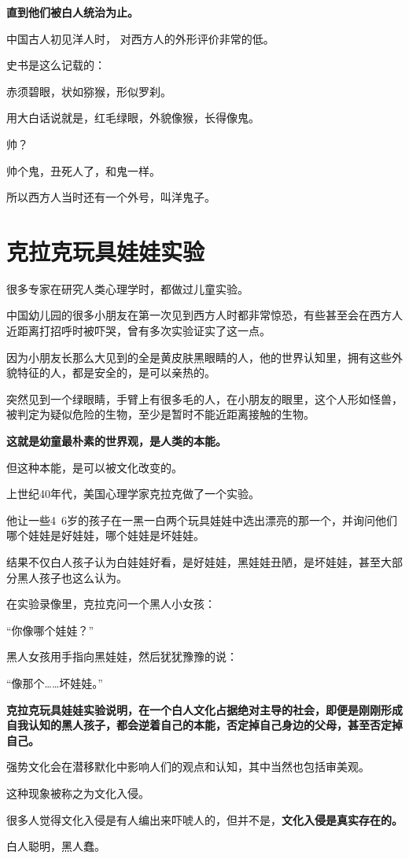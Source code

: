 \documentclass[UTF8, 11pt, oneside]{ctexart}
\newcommand{\zd}[1]{\textbf{\textcolor[RGB]{123,12,0}{#1}}} %
\newcommand{\yh}[1]{%
    \begin{tcolorbox}[enhanced,
        frame hidden, interior hidden,
        before skip = 5mm, left skip=10mm,
        borderline west={5pt}{0pt}{gray!50}]
        #1
    \end{tcolorbox}
}
\newcommand{\biaoti}[1]{%
    \section*{#1}
}
\begin{document}
\zd{直到他们被白人统治为止。}

中国古人初见洋人时， 对西方人的外形评价非常的低。

史书是这么记载的：

\yh{赤须碧眼，状如猕猴，形似罗刹。}

用大白话说就是，红毛绿眼，外貌像猴，长得像鬼。

帅？

帅个鬼，丑死人了，和鬼一样。

所以西方人当时还有一个外号，叫洋鬼子。


\biaoti{克拉克玩具娃娃实验}

很多专家在研究人类心理学时，都做过儿童实验。

中国幼儿园的很多小朋友在第一次见到西方人时都非常惊恐，有些甚至会在西方人近距离打招呼时被吓哭，曾有多次实验证实了这一点。

因为小朋友长那么大见到的全是黄皮肤黑眼睛的人，他的世界认知里，拥有这些外貌特征的人，都是安全的，是可以亲热的。

突然见到一个绿眼睛，手臂上有很多毛的人，在小朋友的眼里，这个人形如怪兽，被判定为疑似危险的生物，至少是暂时不能近距离接触的生物。

\zd{这就是幼童最朴素的世界观，是人类的本能。}

但这种本能，是可以被文化改变的。

上世纪40年代，美国心理学家克拉克做了一个实验。

他让一些4~6岁的孩子在一黑一白两个玩具娃娃中选出漂亮的那一个，并询问他们哪个娃娃是好娃娃，哪个娃娃是坏娃娃。

结果不仅白人孩子认为白娃娃好看，是好娃娃，黑娃娃丑陋，是坏娃娃，甚至大部分黑人孩子也这么认为。

在实验录像里，克拉克问一个黑人小女孩：

\yh{“你像哪个娃娃？”}

黑人女孩用手指向黑娃娃，然后犹犹豫豫的说：

\yh{“像那个……坏娃娃。”}

\zd{克拉克玩具娃娃实验说明，在一个白人文化占据绝对主导的社会，即便是刚刚形成自我认知的黑人孩子，都会逆着自己的本能，否定掉自己身边的父母，甚至否定掉自己。}

强势文化会在潜移默化中影响人们的观点和认知，其中当然也包括审美观。

这种现象被称之为文化入侵。

很多人觉得文化入侵是有人编出来吓唬人的，但并不是，\zd{文化入侵是真实存在的。}

白人聪明，黑人蠢。
\end{document}
